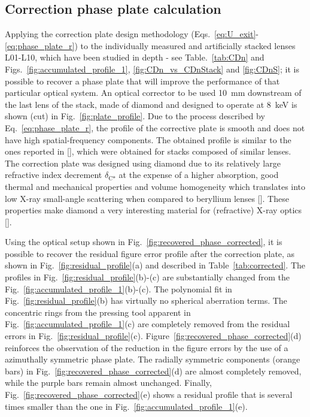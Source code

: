\begin{refsection}
\subsection{Correction phase plate calculation}\label{sec:cpp_calculation}

Applying the correction plate design methodology (Eqs.~\ref{eq:U_exit}-\ref{eq:phase_plate_r}) to the individually measured and artificially stacked lenses L01-L10, which have been studied in depth - see Table.~\ref{tab:CDn} and Figs.~\ref{fig:accumulated_profile_1}, \ref{fig:CDn_vs_CDnStack} and \ref{fig:CDnS}; it is possible to recover a phase plate that will improve the performance of that particular optical system. An optical corrector to be used 10~mm downstream of the last lens of the stack, made of diamond and designed to operate at 8~keV is shown (cut) in Fig.~\ref{fig:plate_profile}. Due to the process described by  Eq.~\ref{eq:phase_plate_r}, the profile of the corrective plate is smooth and does not have high spatial-frequency components. The obtained profile is similar to the ones reported in [\cite{Seiboth2017,Seiboth2018,Seiboth2020}], which were obtained for stacks composed of similar lenses. The correction plate was designed using diamond due to its relatively large refractive index decrement $\delta_\text{C*}$ at the expense of a higher absorption, good thermal and mechanical properties and volume homogeneity which translates into low X-ray small-angle scattering when compared to beryllium lenses [\cite{Chubar2020}]. These properties make diamond a very interesting material for (refractive) X-ray optics [\cite{Polikarpov2016b,ShvydKo2017}].

Using the optical setup shown in Fig.~\ref{fig:recovered_phase_corrected}, it is possible to recover the residual figure error profile after the correction plate, as shown in Fig.~\ref{fig:residual_profile}(a) and described in Table~\ref{tab:corrected}. The profiles in Fig.~\ref{fig:residual_profile}(b)-(c) are substantially changed from the Fig.~\ref{fig:accumulated_profile_1}(b)-(c). The polynomial fit in Fig.~\ref{fig:residual_profile}(b) has virtually no spherical aberration terms. The concentric rings from the pressing tool apparent in Fig.~\ref{fig:accumulated_profile_1}(c) are completely removed from the residual errors in Fig.~\ref{fig:residual_profile}(c). Figure~\ref{fig:recovered_phase_corrected}(d) reinforces the observation of the reduction in the figure errors by the use of a azimuthally symmetric phase plate. The radially symmetric components (orange bars) in Fig.~\ref{fig:recovered_phase_corrected}(d) are almost completely removed, while the purple bars remain almost unchanged. Finally, Fig.~\ref{fig:recovered_phase_corrected}(e) shows a residual profile that is several times smaller than the one in Fig.~\ref{fig:accumulated_profile_1}(e).


\end{refsection}
